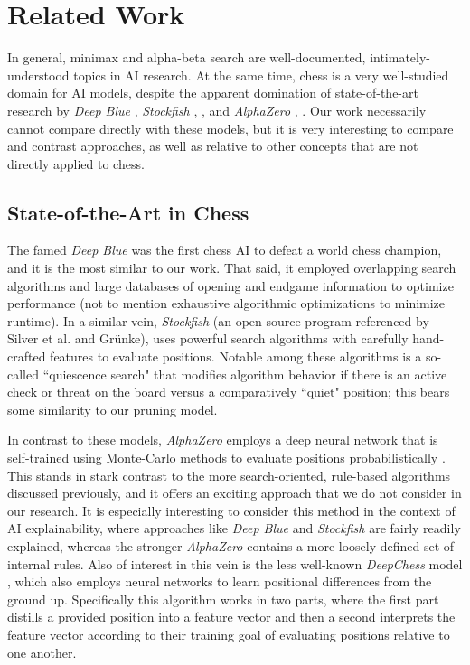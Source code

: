 \documentclass[letterpaper]{article}
\begin{document}
\section{Related Work}
In general, minimax and alpha-beta search are well-documented, intimately-understood topics in AI research.  At the same time, chess is a very well-studied domain for AI models, despite the apparent domination of state-of-the-art research by \textit{Deep Blue} \cite{campbell-et-al2002}, \textit{Stockfish} \cite{silver-et-al17}, \cite{grunke2020}, and \textit{AlphaZero} \cite{silver-et-al17}, \cite{grunke2020}.  Our work necessarily cannot compare directly with these models, but it is very interesting to compare and contrast approaches, as well as relative to other concepts that are not directly applied to chess.

\subsection{State-of-the-Art in Chess}
The famed \textit{Deep Blue} \cite{campbell-et-al2002} was the first chess AI to defeat a world chess champion, and it is the most similar to our work.  That said, it employed overlapping search algorithms and large databases of opening and endgame information to optimize performance (not to mention exhaustive algorithmic optimizations to minimize runtime).  In a similar vein, \textit{Stockfish} (an open-source program referenced by Silver et al. and Grünke), uses powerful search algorithms with carefully hand-crafted features to evaluate positions.  Notable among these algorithms is a so-called ``quiescence search" that modifies algorithm behavior if there is an active check or threat on the board versus a comparatively ``quiet" position; this bears some similarity to our pruning model.

In contrast to these models, \textit{AlphaZero} employs a deep neural network that is self-trained using Monte-Carlo methods to evaluate positions probabilistically \cite{silver-et-al17}.  This stands in stark contrast to the more search-oriented, rule-based algorithms discussed previously, and it offers an exciting approach that we do not consider in our research.  It is especially interesting to consider this method in the context of AI explainability, where approaches like \textit{Deep Blue} and \textit{Stockfish} are fairly readily explained, whereas the stronger \textit{AlphaZero} contains a more loosely-defined set of internal rules.  Also of interest in this vein is the less well-known \textit{DeepChess} model \cite{david-et-al2016}, which also employs neural networks to learn positional differences from the ground up.   Specifically this algorithm works in two parts, where the first part distills a provided position into a feature vector and then a second interprets the feature vector according to their training goal of evaluating positions relative to one another.
\end{document}
